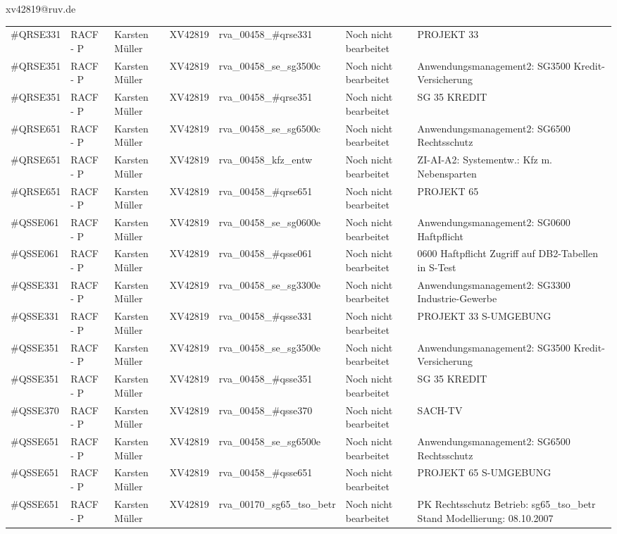 \documentclass[a4paper,landscape,12pt]{letter}
\begin{document}
\begin{letter}{xv42819@ruv.de\hfill \break}
\begin{tiny}
\begin{longtable}{|p{35mm}|p{15mm}|p{25mm}|p{10mm}|p{40mm}|p{50mm}|p{50mm}|}
\#QRSE331 & RACF - P & Karsten Müller & XV42819 & rva\_00458\_\#qrse331 & Noch nicht bearbeitet & PROJEKT 33 \\
\#QRSE351 & RACF - P & Karsten Müller & XV42819 & rva\_00458\_se\_sg3500c & Noch nicht bearbeitet & Anwendungsmanagement2: SG3500 Kredit-Versicherung \\
\#QRSE351 & RACF - P & Karsten Müller & XV42819 & rva\_00458\_\#qrse351 & Noch nicht bearbeitet & SG 35 KREDIT \\
\#QRSE651 & RACF - P & Karsten Müller & XV42819 & rva\_00458\_se\_sg6500c & Noch nicht bearbeitet & Anwendungsmanagement2: SG6500 Rechtsschutz \\
\#QRSE651 & RACF - P & Karsten Müller & XV42819 & rva\_00458\_kfz\_entw & Noch nicht bearbeitet & ZI-AI-A2: Systementw.: Kfz m. Nebensparten \\
\#QRSE651 & RACF - P & Karsten Müller & XV42819 & rva\_00458\_\#qrse651 & Noch nicht bearbeitet & PROJEKT 65 \\
\#QSSE061 & RACF - P & Karsten Müller & XV42819 & rva\_00458\_se\_sg0600e & Noch nicht bearbeitet & Anwendungsmanagement2: SG0600 Haftpflicht \\
\#QSSE061 & RACF - P & Karsten Müller & XV42819 & rva\_00458\_\#qsse061 & Noch nicht bearbeitet & 0600 Haftpflicht Zugriff auf DB2-Tabellen in S-Test \\
\#QSSE331 & RACF - P & Karsten Müller & XV42819 & rva\_00458\_se\_sg3300e & Noch nicht bearbeitet & Anwendungsmanagement2: SG3300 Industrie-Gewerbe \\
\#QSSE331 & RACF - P & Karsten Müller & XV42819 & rva\_00458\_\#qsse331 & Noch nicht bearbeitet & PROJEKT 33 S-UMGEBUNG \\
\#QSSE351 & RACF - P & Karsten Müller & XV42819 & rva\_00458\_se\_sg3500e & Noch nicht bearbeitet & Anwendungsmanagement2: SG3500 Kredit-Versicherung \\
\#QSSE351 & RACF - P & Karsten Müller & XV42819 & rva\_00458\_\#qsse351 & Noch nicht bearbeitet & SG 35 KREDIT \\
\#QSSE370 & RACF - P & Karsten Müller & XV42819 & rva\_00458\_\#qsse370 & Noch nicht bearbeitet & SACH-TV \\
\#QSSE651 & RACF - P & Karsten Müller & XV42819 & rva\_00458\_se\_sg6500e & Noch nicht bearbeitet & Anwendungsmanagement2: SG6500 Rechtsschutz \\
\#QSSE651 & RACF - P & Karsten Müller & XV42819 & rva\_00458\_\#qsse651 & Noch nicht bearbeitet & PROJEKT 65 S-UMGEBUNG \\
\#QSSE651 & RACF - P & Karsten Müller & XV42819 & rva\_00170\_sg65\_tso\_betr & Noch nicht bearbeitet & PK Rechtsschutz Betrieb: sg65\_tso\_betr Stand Modellierung: 08.10.2007 \\

\end{longtable}
\end{tiny}
\end{letter}
\end{document}
